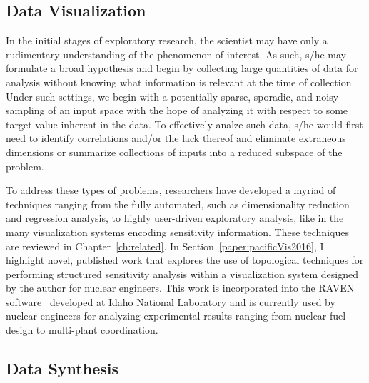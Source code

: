 \subsection{Data Visualization}

In the initial stages of exploratory research, the scientist may have only a rudimentary understanding of the phenomenon of interest.
%
As such, s/he may formulate a broad hypothesis and begin by collecting large quantities of data for analysis without knowing what information is relevant at the time of collection.
%
Under such settings, we begin with a potentially sparse, sporadic, and noisy sampling of an input space with the hope of analyzing it with respect to some target value inherent in the data.
%
To effectively analze such data, s/he would first need to identify correlations and/or the lack thereof and eliminate extraneous dimensions or summarize collections of inputs into a reduced subspace of the problem.

To address these types of problems, researchers have developed a myriad of techniques ranging from the fully automated, such as dimensionality reduction and regression analysis, to highly user-driven exploratory analysis, like in the many visualization systems encoding sensitivity information.
%
These techniques are reviewed in Chapter~\ref{ch:related}.
%
In Section~\ref{paper:pacificVis2016}, I highlight novel, published work that explores the use of topological techniques for performing structured sensitivity analysis within a visualization system designed by the author for nuclear engineers.
%
This work is incorporated into the RAVEN software~\cite{RabitiAlfonsiCogliati2015} developed at Idaho National Laboratory and is currently used by nuclear engineers for analyzing experimental results ranging from nuclear fuel design to multi-plant coordination.

\subsection{Data Synthesis}


